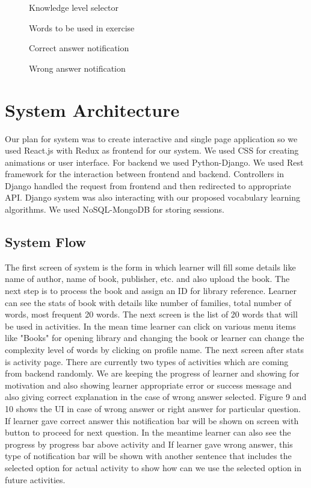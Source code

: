 \documentclass[11pt,a4paper]{article}
\begin{document}
\begin{figure}
\begin{tcbraster}[raster columns=1, enhanced, blankest]
\caption{Knowledge level selector}
\caption{Words to be used in exercise}
\caption{Correct answer notification}
\caption{Wrong answer notification}
\end{tcbraster}
\end{figure}


\section{System Architecture}
Our plan for system was to create interactive and single page application so we used React.js with Redux as frontend for our system. We used CSS for creating animations or user interface. For backend we used Python-Django. We used Rest framework for the interaction between frontend and backend. Controllers in Django handled the request from frontend and then redirected to appropriate API. Django system was also interacting with our proposed vocabulary learning algorithms. We used NoSQL-MongoDB for storing sessions.   



\subsection{System Flow}
The first screen of system is the form in which learner will fill some details like name of author, name of book, publisher, etc. and also upload the book. The next step is to process the book and assign an ID for library reference. Learner can see the stats of book with details like number of families, total number of words, most frequent 20 words. 
The next screen is the list of 20 words that will be used in activities. In the mean time learner can click on various menu items like "Books" for opening library and changing the book or learner can change the complexity level of words by clicking on profile name. The next screen after stats is activity page. There are currently two types of activities which are coming from backend randomly. We are keeping the progress of learner and showing for motivation and also showing learner appropriate error or success message and also giving correct explanation in the case of wrong answer selected. Figure 9 and 10 shows the UI in case of wrong answer or right answer for particular question. If learner gave correct answer this notification bar will be shown on screen with button to proceed for next question. In the meantime learner can also see the progress by progress bar above activity and If learner gave wrong answer, this type of notification bar will be shown with another sentence that includes the selected option for actual activity to show how can we use the selected option in future activities.
\end{document}
